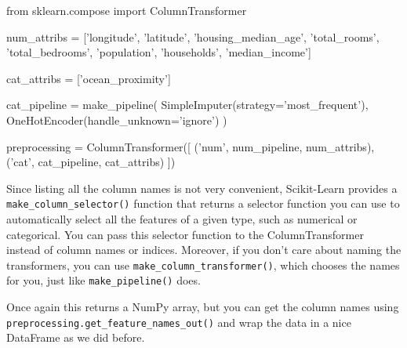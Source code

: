 \begin{pyc}
from sklearn.compose import ColumnTransformer

num_attribs = ['longitude', 'latitude', 'housing_median_age', 'total_rooms',
               'total_bedrooms', 'population', 'households', 'median_income']

cat_attribs = ['ocean_proximity']

cat_pipeline = make_pipeline(
    SimpleImputer(strategy='most_frequent'),
    OneHotEncoder(handle_unknown='ignore')
)

preprocessing = ColumnTransformer([
    ('num', num_pipeline, num_attribs),
    ('cat', cat_pipeline, cat_attribs)
])
\end{pyc}


Since listing all the column names is not very convenient, Scikit-Learn provides
a \verb|make_column_selector()| function that returns a selector function you can use
to automatically select all the features of a given type, such as numerical or categorical. You can pass this selector function to the ColumnTransformer instead of
column names or indices. Moreover, if you don't care about naming the transformers, you can use \verb|make_column_transformer()|, which chooses the names for you,
just like \verb|make_pipeline()| does. 

Once again this returns a NumPy array, but you can get the column names using
\verb|preprocessing.get_feature_names_out()| and wrap the data in a nice DataFrame
as we did before.


